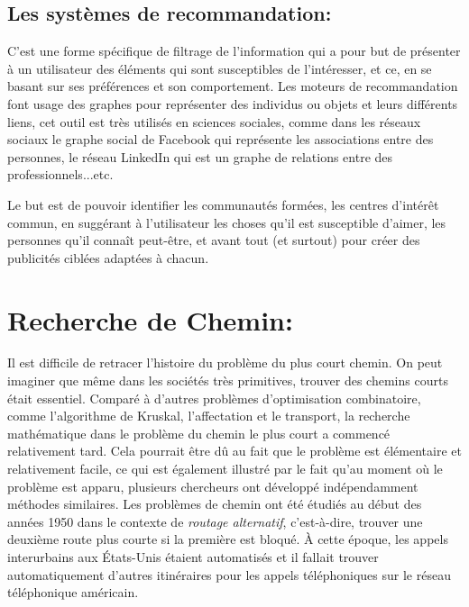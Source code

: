 \subsection{Les systèmes de recommandation:}
C'est une forme spécifique de filtrage de l'information qui a pour but de présenter à un utilisateur des éléments qui sont susceptibles de l'intéresser, et ce, en se basant sur ses préférences et son comportement.
Les moteurs de recommandation font usage des graphes pour représenter des individus ou objets et leurs différents liens, cet outil est très utilisés en sciences sociales, comme dans les réseaux sociaux le graphe social de Facebook qui représente les associations entre des personnes, le réseau LinkedIn qui est un graphe de relations entre des professionnels...etc.

Le but est de pouvoir identifier les communautés formées, les centres d'intérêt commun, en suggérant à l'utilisateur les choses qu'il est susceptible d'aimer, les personnes qu'il connaît peut-être, et avant tout (et surtout) pour créer des publicités ciblées adaptées à chacun.


\section{Recherche de Chemin:}
Il est difficile de retracer l'histoire du problème du plus court chemin. On peut imaginer que même dans les sociétés très primitives, trouver des chemins courts était essentiel. Comparé à d'autres problèmes d'optimisation combinatoire, comme l'algorithme de Kruskal, l'affectation et le transport, la recherche mathématique dans le problème du chemin le plus court a commencé relativement tard. Cela pourrait être dû au fait que le problème est élémentaire et relativement facile, ce qui est également illustré par le fait qu'au moment où le problème est apparu, plusieurs chercheurs ont développé indépendamment méthodes similaires.
Les problèmes de chemin ont été étudiés au début des années 1950 dans le contexte de \emph{routage alternatif}, c'est-à-dire, trouver une deuxième route plus courte si la première est bloqué. À cette époque, les appels interurbains aux États-Unis étaient automatisés et il fallait trouver automatiquement d'autres itinéraires pour les appels téléphoniques sur le réseau téléphonique américain.
	
